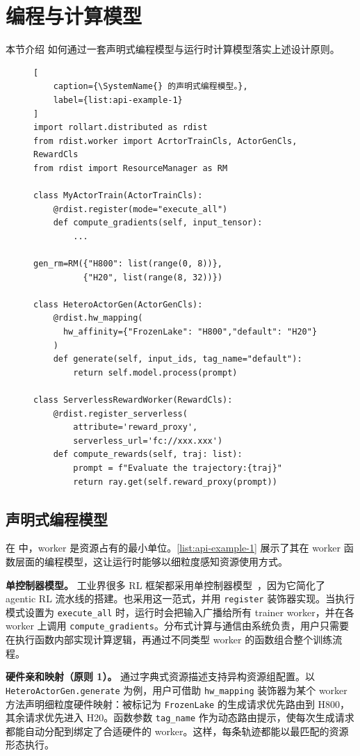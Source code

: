 \section{编程与计算模型}
\label{sec:programming-model}
本节介绍 \SystemName{}如何通过一套声明式编程模型与运行时计算模型落实上述设计原则。

\begin{figure}[t]
\centering
\begin{lstlisting}[
    caption={\SystemName{} 的声明式编程模型。},
    label={list:api-example-1}
]
import rollart.distributed as rdist
from rdist.worker import AcrtorTrainCls, ActorGenCls, RewardCls
from rdist import ResourceManager as RM

class MyActorTrain(ActorTrainCls):
    @rdist.register(mode="execute_all")
    def compute_gradients(self, input_tensor):
        ...

gen_rm=RM({"H800": list(range(0, 8))},
          {"H20", list(range(8, 32))})

class HeteroActorGen(ActorGenCls):
    @rdist.hw_mapping(
      hw_affinity={"FrozenLake": "H800","default": "H20"}
    )
    def generate(self, input_ids, tag_name="default"):
        return self.model.process(prompt)

class ServerlessRewardWorker(RewardCls):
    @rdist.register_serverless(
        attribute='reward_proxy',
        serverless_url='fc://xxx.xxx')
    def compute_rewards(self, traj: list):
        prompt = f"Evaluate the trajectory:{traj}"
        return ray.get(self.reward_proxy(prompt))
\end{lstlisting}
\end{figure}

\subsection{声明式编程模型}
在 \SystemName{} 中，worker 是资源占有的最小单位。\autoref{list:api-example-1} 展示了其在 worker 函数层面的编程模型，这让运行时能够以细粒度感知资源使用方式。

\noindent\textbf{单控制器模型。}
工业界很多 RL 框架都采用单控制器模型~\cite{verl,slime_github}，因为它简化了 agentic RL 流水线的搭建。\SystemName{}也采用这一范式，并用 \texttt{register} 装饰器实现。当执行模式设置为 \texttt{execute\_all} 时，运行时会把输入广播给所有 trainer worker，并在各 worker 上调用 \texttt{compute\_gradients}。分布式计算与通信由系统负责，用户只需要在执行函数内部实现计算逻辑，再通过不同类型 worker 的函数组合整个训练流程。

\noindent\textbf{硬件亲和映射（原则 1）。}
\SystemName{}通过字典式资源描述支持异构资源组配置。以 \texttt{HeteroActorGen.generate} 为例，用户可借助 \texttt{hw\_mapping} 装饰器为某个 worker 方法声明细粒度硬件映射：被标记为 \texttt{FrozenLake} 的生成请求优先路由到 H800，其余请求优先进入 H20。函数参数 \texttt{tag\_name} 作为动态路由提示，使每次生成请求都能自动分配到绑定了合适硬件的 worker。这样，每条轨迹都能以最匹配的资源形态执行。

